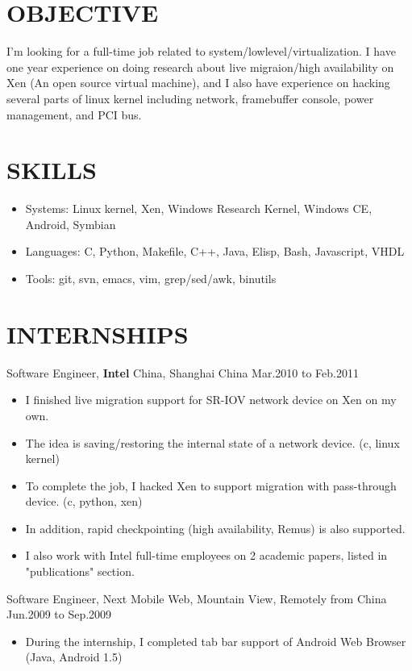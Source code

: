 \documentclass[11pt]{res} %
\begin{document}
\begin{resume}

\section{OBJECTIVE}
I'm looking for a full-time job related to
system/lowlevel/virtualization. I have one year experience on doing
research about live migraion/high availability on Xen (An open source
virtual machine), and I also have experience on hacking several parts
of linux kernel including network, framebuffer console, power
management, and PCI bus.

\section{SKILLS}

\begin{itemize} \itemsep -2pt
\item Systems: Linux kernel, Xen, Windows Research Kernel, Windows CE, Android, Symbian
\item Languages: C, Python, Makefile, C++, Java, Elisp, Bash, Javascript, VHDL
\item Tools: git, svn, emacs, vim, grep/sed/awk, binutils
\end{itemize} 

\section{INTERNSHIPS}
Software Engineer, \textbf{Intel} China, Shanghai China \hfill Mar.2010 to Feb.2011
\begin{itemize} \itemsep -2pt
\item I finished live migration support for SR-IOV network device on Xen on my own.
\item The idea is saving/restoring the internal state of a network device. (c, linux kernel)
\item To complete the job, I hacked Xen to support migration with pass-through device. (c, python, xen)
\item In addition, rapid checkpointing (high availability, Remus) is also supported.
\item I also work with Intel full-time employees on 2 academic papers, listed in "publications" section.
\end{itemize} 

Software Engineer, Next Mobile Web, Mountain View, Remotely from China \\
\hspace*{\fill} Jun.2009 to Sep.2009
\begin{itemize} \itemsep -2pt
\item During the internship, I completed tab bar support of Android Web Browser (Java, Android 1.5)
\end{itemize} 


\end{resume}
\end{document}
